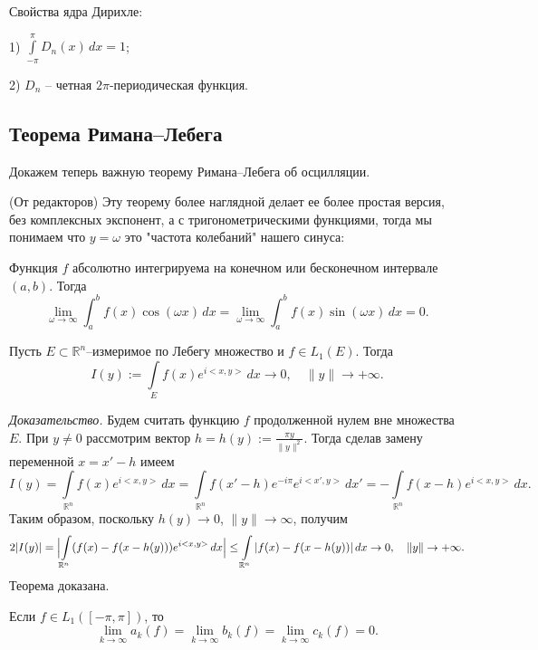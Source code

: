 Свойства ядра Дирихле:

1) $\int\limits_{-\pi}^{\pi}D_{n}(x)\,dx=1$;

2) $D_{n}$ -- четная $2\pi$-периодическая функция.

\subsection{Теорема Римана--Лебега}

Докажем теперь важную теорему Римана--Лебега об осцилляции.
\begin{note}
    (От редакторов) Эту теорему более наглядной делает ее более простая версия, без комплексных экспонент, а с тригонометрическими функциями, тогда мы понимаем что $y=\omega$ это "частота колебаний" нашего синуса:

Функция \( f \) абсолютно интегрируема на конечном или бесконечном интервале \( (a, b) \). Тогда
\[
\lim_{\omega \to \infty} \int_a^b f(x) \cos(\omega x)\,dx = \lim_{\omega \to \infty} \int_a^b f(x) \sin(\omega x)\,dx = 0.
\]
\end{note}
    
\begin{theorem}
Пусть $E \subset \mathbb{R}^{n}$--измеримое по Лебегу множество и $f \in L_{1}(E)$. Тогда
\begin{equation}
\label{Th.Riemann_Lebesgue}
I(y):=\int\limits_{E}f(x)e^{i<x,y>}\,dx \to 0, \quad \|y\| \to +\infty.
\end{equation}
\end{theorem}

\textit{Доказательство.}
Будем считать функцию $f$ продолженной нулем вне множества $E$. 
При $y \neq 0$ рассмотрим вектор $h=h(y):=\frac{\pi y}{\|y\|^{2}}$.
Тогда сделав замену переменной $x=x'-h$ имеем
$$
I(y)=\int\limits_{\mathbb{R}^{n}}f(x)e^{i<x,y>}\,dx = \int\limits_{\mathbb{R}^{n}}f(x'-h)e^{-i\pi}e^{i<x',y>}\,dx' = -\int\limits_{\mathbb{R}^{n}}f(x-h)e^{i<x,y>}\,dx.
$$
Таким образом, поскольку $h(y) \to 0$, $\|y\| \to \infty$, получим
\begin{equation}
2|I(y)| = \Bigl|\int\limits_{\mathbb{R}^{n}}(f(x)-f(x-h(y)))e^{i<x,y>}\,dx\Bigr| \le \int\limits_{\mathbb{R}^{n}}|f(x)-f(x-h(y))|\,dx \to 0, \quad \|y\| \to +\infty.
\end{equation}
Теорема доказана.


\begin{corollary}
Если $f \in L_{1}([-\pi,\pi])$, то 
$$
\lim\limits_{k \to \infty}a_{k}(f) = \lim\limits_{k \to \infty}b_{k}(f) = \lim\limits_{k \to \infty}c_{k}(f) = 0.
$$

\end{corollary}

